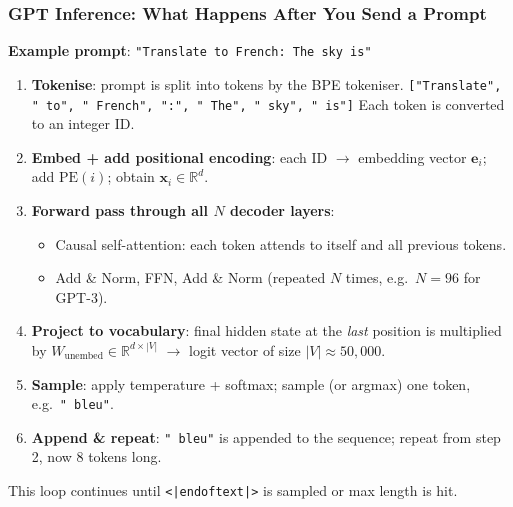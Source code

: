 \begin{frame}[fragile]\frametitle{GPT Inference: What Happens After You Send a Prompt}
\textbf{Example prompt}: \texttt{"Translate to French: The sky is"}

\begin{enumerate}
\item \textbf{Tokenise}: prompt is split into tokens by the BPE tokeniser.
      \texttt{["Translate", "\,to", "\,French", ":", "\,The", "\,sky", "\,is"]}
      Each token is converted to an integer ID.
\item \textbf{Embed + add positional encoding}: each ID $\rightarrow$ embedding vector
      $\mathbf{e}_i$; add $\text{PE}(i)$; obtain $\mathbf{x}_i \in \mathbb{R}^d$.
\item \textbf{Forward pass through all $N$ decoder layers}:
      \begin{itemize}
      \item Causal self-attention: each token attends to itself and all previous tokens.
      \item Add \& Norm, FFN, Add \& Norm (repeated $N$ times, e.g.\ $N=96$ for GPT-3).
      \end{itemize}
\item \textbf{Project to vocabulary}: final hidden state at the \emph{last} position
      is multiplied by $W_{\text{unembed}} \in \mathbb{R}^{d \times |V|}$
      $\rightarrow$ logit vector of size $|V| \approx 50{,}000$.
\item \textbf{Sample}: apply temperature + softmax; sample (or argmax) one token,
      e.g.\ \texttt{"\,bleu"}.
\item \textbf{Append \& repeat}: \texttt{"\,bleu"} is appended to the sequence;
      repeat from step 2,  now 8 tokens long.
\end{enumerate}
This loop continues until \texttt{<|endoftext|>} is sampled or max length is hit.
\end{frame}


